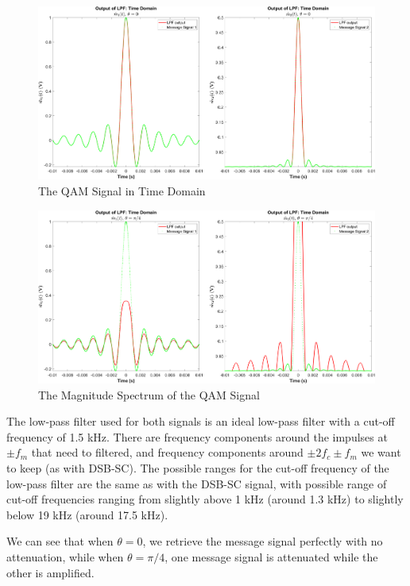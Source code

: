 \documentclass[12pt]{article}
\begin{document}
\begin{figure}[h]
    \centering
    \includegraphics[width=\textwidth]{qam_demod_lpf_theta_0}
    \caption{\label{fig:qam_demod_lpf_0}The QAM Signal in Time Domain}
\end{figure}
\begin{figure}[h]
    \centering
    \includegraphics[width=\textwidth]{qam_demod_lpf_theta_0.7854}
    \caption{\label{fig:qam_demod_lpf_p4}The Magnitude Spectrum of the QAM Signal}
\end{figure}

The low-pass filter used for both signals is an ideal low-pass filter with a cut-off frequency of 1.5 kHz. There are frequency components around the impulses at $\pm f_m$ that need to filtered, and frequency components around $\pm 2f_c \pm f_m$ we want to keep (as with DSB-SC). The possible ranges for the cut-off frequency of the low-pass filter are the same as with the DSB-SC signal, with possible range of cut-off frequencies ranging from slightly above 1 kHz (around 1.3 kHz) to slightly below 19 kHz (around 17.5 kHz). %

We can see that when $\theta = 0$, we retrieve the message signal perfectly with no attenuation, while when $\theta = \pi/4$, one message signal is attenuated while the other is amplified.
\end{document}
